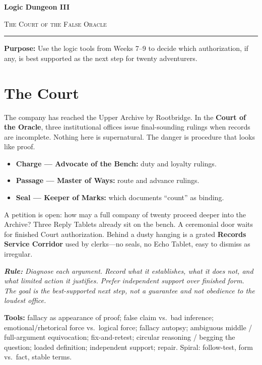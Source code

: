 \documentclass[12pt]{article}
\newcommand{\cluebox}[1]{\par\vspace{0.12em}\noindent\begin{minipage}{\textwidth}\itshape #1\end{minipage}\par\vspace{0.12em}}
\begin{document}
\begin{center}
{\LARGE\bfseries Logic Dungeon III}\par\vspace{0.04em}
{\large\scshape The Court of the False Oracle}\par\vspace{0.08em}
\rule{0.78\textwidth}{0.5pt}\par
\end{center}
\textbf{Purpose:} Use the logic tools from Weeks 7--9 to decide which authorization, if any, is best supported as the next step for twenty adventurers.

\section*{The Court}
The company has reached the Upper Archive by Rootbridge. In the \textbf{Court of the Oracle}, three institutional offices issue final-sounding rulings when records are incomplete. Nothing here is supernatural. The danger is procedure that looks like proof.

\begin{itemize}[leftmargin=1.5em,itemsep=0.06em]
\item \textbf{Charge --- Advocate of the Bench:} duty and loyalty rulings.
\item \textbf{Passage --- Master of Ways:} route and advance rulings.
\item \textbf{Seal --- Keeper of Marks:} which documents ``count'' as binding.
\end{itemize}

A petition is open: how may a full company of twenty proceed deeper into the Archive? Three Reply Tablets already sit on the bench. A ceremonial door waits for finished Court authorization. Behind a dusty hanging is a grated \textbf{Records Service Corridor} used by clerks---no seals, no Echo Tablet, easy to dismiss as irregular.

\cluebox{\textbf{Rule:} Diagnose each argument. Record what it establishes, what it does not, and what limited action it justifies. Prefer \emph{independent support} over finished form. The goal is the \emph{best-supported next step}, not a guarantee and not obedience to the loudest office.}

\textbf{Tools:} fallacy as appearance of proof; false claim vs.\ bad inference; emotional/rhetorical force vs.\ logical force; fallacy autopsy; ambiguous middle / full-argument equivocation; fix-and-retest; circular reasoning / begging the question; loaded definition; independent support; repair. Spiral: follow-test, form vs.\ fact, stable terms.
\newpage
\end{document}
